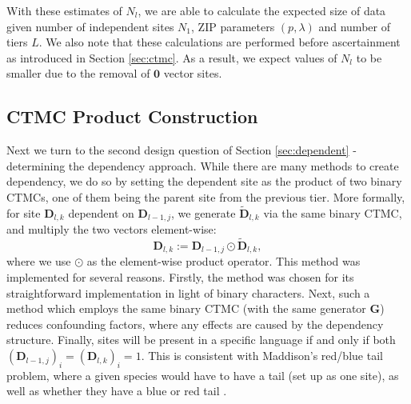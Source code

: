 With these estimates of $N_l$, we are able to calculate the expected size of data given number of independent sites $N_1$, ZIP parameters $(p, \lambda)$ and number of tiers $L$. We also note that these calculations are performed before ascertainment as introduced in Section \ref{sec:ctmc}. As a result, we expect values of $N_l$ to be smaller due to the removal of $\mathbf{0}$ vector sites. 

\subsection{CTMC Product Construction}
\label{sec:ctmcproduct}
Next we turn to the second design question of Section \ref{sec:dependent} - determining the dependency approach. While there are many methods to create dependency, we do so by setting the dependent site as the product of two binary CTMCs, one of them being the parent site from the previous tier. More formally, for site $\mathbf{D}_{l, k}$ dependent on $\mathbf{D}_{l-1, j}$, we generate $\tilde{\mathbf{D}}_{l, k}$ via the same binary CTMC, and multiply the two vectors element-wise:
\begin{equation}
\label{eq:dependencystructure}
    \mathbf{D}_{l, k} := \mathbf{D}_{l-1, j} \odot \tilde{\mathbf{D}}_{l, k},
\end{equation}
where we use $\odot$ as the element-wise product operator. This method was implemented for several reasons. Firstly, the method was chosen for its straightforward implementation in light of binary characters. Next, such a method which employs the same binary CTMC (with the same generator $\mathbf{G}$) reduces confounding factors, where any effects are caused by the dependency structure. Finally, sites will be present in a specific language if and only if both $(\mathbf{D}_{l-1, j})_i = (\mathbf{D}_{l, k})_i = 1$. This is consistent with Maddison's red/blue tail problem, where a given species would have to have a tail (set up as one site), as well as whether they have a blue or red tail \cite{Maddison1993}. 

